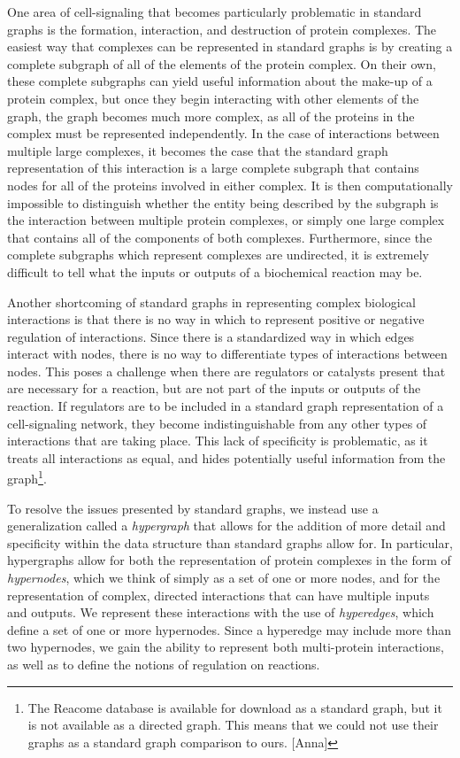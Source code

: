 \documentclass[12pt,twoside]{reedthesis}
\newcommand{\new}[2]{{\color{orange}#1 [#2]}}
\theoremstyle{definition}
\begin{document}
One area of cell-signaling that becomes particularly problematic in standard graphs is the formation, interaction, and destruction of protein complexes.  The easiest way that complexes can be represented in standard graphs is by creating a complete subgraph of all of the elements of the protein complex.  On their own, these complete subgraphs can yield useful information about the make-up of a protein complex, but once they begin interacting with other elements of the graph, the graph becomes much more complex, as all of the proteins in the complex must be represented independently.  In the case of interactions between multiple large complexes, it becomes the case that the standard graph representation of this interaction is a large complete subgraph that contains nodes for all of the proteins involved in either complex.  It is then computationally impossible to distinguish whether the entity being described by the subgraph is the interaction between multiple protein complexes, or simply one large complex that contains all of the components of both complexes.  Furthermore, since the complete subgraphs which represent complexes are undirected, it is extremely difficult to tell what the inputs or outputs of a biochemical reaction may be.\par

Another shortcoming of standard graphs in representing complex biological interactions is that there is no way in which to represent positive or negative regulation of interactions.  Since there is a standardized way in which edges interact with nodes, there is no way to differentiate types of interactions between nodes.  This poses a challenge when there are regulators or catalysts present that are necessary for a reaction, but are not part of the inputs or outputs of the reaction.  If regulators are to be included in a standard graph representation of a cell-signaling network, they become indistinguishable from any other types of interactions that are taking place.  This lack of specificity is problematic, as it treats all interactions as equal, and hides potentially useful information from the graph\footnote{\new{The Reacome database is available for download as a standard graph, but it is not available as a directed graph. This means that we could not use their graphs as a standard graph comparison to ours.}{Anna}}.\par

To resolve the issues presented by standard graphs, we instead use a generalization called a \textit{hypergraph} that allows for the addition of more detail  and specificity within the data structure than standard graphs allow for.  In particular, hypergraphs allow for both the representation of protein complexes in the form of \textit{hypernodes}, which we think of simply as a set of one or more nodes, and for the representation of complex, directed interactions that can have multiple inputs and outputs.  We represent these interactions with the use of \textit{hyperedges}, which define a set of one or more hypernodes.  Since a hyperedge may include more than two hypernodes, we gain the ability to represent both multi-protein interactions, as well as to define the notions of regulation on reactions.\par
\end{document}
